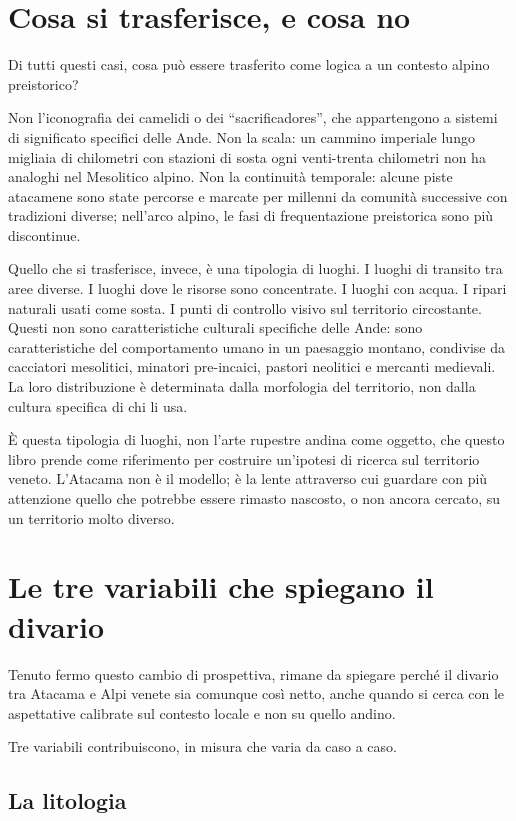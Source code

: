 \section{Cosa si trasferisce, e cosa no}

Di tutti questi casi, cosa può essere trasferito come logica a un contesto alpino preistorico?

Non l'iconografia dei camelidi o dei ``sacrificadores'', che appartengono a sistemi di significato specifici delle Ande. Non la scala: un cammino imperiale lungo migliaia di chilometri con stazioni di sosta ogni venti-trenta chilometri non ha analoghi nel Mesolitico alpino. Non la continuità temporale: alcune piste atacamene sono state percorse e marcate per millenni da comunità successive con tradizioni diverse; nell'arco alpino, le fasi di frequentazione preistorica sono più discontinue.

Quello che si trasferisce, invece, è una tipologia di luoghi. I luoghi di transito tra aree diverse. I luoghi dove le risorse sono concentrate. I luoghi con acqua. I ripari naturali usati come sosta. I punti di controllo visivo sul territorio circostante. Questi non sono caratteristiche culturali specifiche delle Ande: sono caratteristiche del comportamento umano in un paesaggio montano, condivise da cacciatori mesolitici, minatori pre-incaici, pastori neolitici e mercanti medievali. La loro distribuzione è determinata dalla morfologia del territorio, non dalla cultura specifica di chi li usa.

È questa tipologia di luoghi, non l'arte rupestre andina come oggetto, che questo libro prende come riferimento per costruire un'ipotesi di ricerca sul territorio veneto. L'Atacama non è il modello; è la lente attraverso cui guardare con più attenzione quello che potrebbe essere rimasto nascosto, o non ancora cercato, su un territorio molto diverso.

\section{Le tre variabili che spiegano il divario}

Tenuto fermo questo cambio di prospettiva, rimane da spiegare perché il divario tra Atacama e Alpi venete sia comunque così netto, anche quando si cerca con le aspettative calibrate sul contesto locale e non su quello andino.

Tre variabili contribuiscono, in misura che varia da caso a caso.

\subsection{La litologia}

